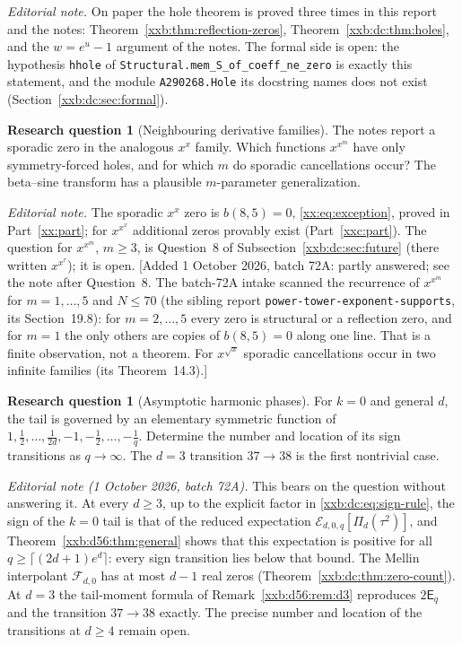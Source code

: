 \documentclass[11pt,a4paper]{article}
\numberwithin{equation}{section}
\theoremstyle{definition}
\newtheorem{question}[theorem]{Research question}
\theoremstyle{remark}
\theoremstyle{plain}
\newcommand{\sibPTE}{\texttt{power-\allowbreak{}tower-\allowbreak{}exponent-\allowbreak{}supports}}
\begin{document}
\emph{Editorial note.}  On paper the hole theorem is proved three times in
this report and the notes: Theorem~\ref{xxb:thm:reflection-zeros},
Theorem~\ref{xxb:dc:thm:holes}, and the $w=e^u-1$ argument of the notes.  The
formal side is open: the hypothesis \texttt{hhole} of
\texttt{Structural.mem\_\allowbreak S\_\allowbreak of\_\allowbreak coeff\_\allowbreak ne\_\allowbreak zero}
is exactly this statement, and the module \texttt{A290268.Hole} its docstring
names does not exist (Section~\ref{xxb:dc:sec:formal}).

\begin{question}[Neighbouring derivative families]
The notes report a sporadic zero in the analogous $x^x$ family.  Which
functions $x^{x^m}$ have only symmetry-forced holes, and for which $m$ do
sporadic cancellations occur?  The beta--sine transform has a plausible
$m$-parameter generalization.
\end{question}

\emph{Editorial note.}  The sporadic $x^x$ zero is
$b(8,5)=0$, \eqref{xx:eq:exception}, proved in Part~\ref{xx:part}; for
$x^{x^x}$ additional zeros provably exist (Part~\ref{xxc:part}).  The question
for $x^{x^m}$, $m\ge3$, is Question~8 of Subsection~\ref{xxb:dc:sec:future}
(there written $x^{x^r}$); it is open.
[Added 1 October 2026, batch 72A: partly answered; see the note after Question~8.
The batch-72A intake scanned the recurrence of $x^{x^m}$ for $m=1,\ldots,5$
and $N\le70$ (the sibling report \sibPTE{}, its Section~19.8): for
$m=2,\ldots,5$ every zero is structural or a reflection zero, and for $m=1$ the
only others are copies of $b(8,5)=0$ along one line.  That is a finite
observation, not a theorem.  For $x^{\sqrt x}$ sporadic cancellations occur in
two infinite families (its Theorem~14.3).]

\begin{question}[Asymptotic harmonic phases]
For $k=0$ and general $d$, the tail is governed by an elementary symmetric
function of $1,\frac12,\ldots,\frac1{2d},-1,-\frac12,\ldots,-\frac1q$.
Determine the number and location of its sign transitions as $q\to\infty$.
The $d=3$ transition $37\to38$ is the first nontrivial case.
\end{question}

\emph{Editorial note (1 October 2026, batch 72A).}  This bears on the
question without answering it.  At every $d\ge3$, up to the explicit factor
in \eqref{xxb:dc:eq:sign-rule}, the sign of the $k=0$ tail is that of the
reduced expectation $\mathcal E_{d,0,q}[\Pi_d(\tau^2)]$, and
Theorem~\ref{xxb:d56:thm:general} shows that this expectation is positive for
all $q\ge\lceil(2d+1)e^d\rceil$: every sign transition lies below that bound.
The Mellin interpolant $\mathcal F_{d,0}$ has at most $d-1$ real zeros
(Theorem~\ref{xxb:dc:thm:zero-count}).  At
$d=3$ the tail-moment formula of Remark~\ref{xxb:d56:rem:d3} reproduces
$2\mathsf E_q$ and the transition $37\to38$ exactly.  The precise number and
location of the transitions at $d\ge4$ remain open.
\end{document}
